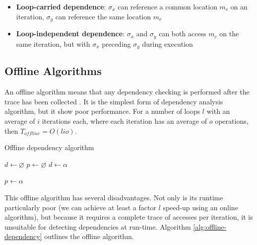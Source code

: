 	\begin{itemize}
		\item \textbf{Loop-carried dependence}: $\sigma_x$ can reference a common location $m_c$ on an iteration, $\sigma_y$ can reference the same location $m_c$
		\item \textbf{Loop-independent dependence}: $\sigma_x$ and $\sigma_y$ can both access $m_c$ on the same iteration, but with $\sigma_x$ preceding $\sigma_y$ during execution
	\end{itemize}

	\subsection{Offline Algorithms} \label{sec:runtime/analysis/offline}
	An offline algorithm means that any dependency checking is performed after the trace has been collected \citep[p.~525-526]{TAOCPvol2}. It is the simplest form of dependency analysis algorithm, but it show poor performance. For a number of loops $l$ with an average of $i$ iterations each, where each iteration has an average of $o$ operations, then $T_{offline}=O(lio)$.
	
	\begin{algorithm}
		\caption{Offline dependency algorithm}
		\label{alg:offline-dependency}
		\begin{algorithmic}[1]
			\STATE $d \gets \varnothing$ %
				\STATE $p \gets \varnothing$ %
								\STATE $d \gets \alpha$
							\ENDIF
							
							\STATE $p \gets \alpha$
						\ENDFOR
					\ENDFOR
				\ENDFOR
			\ENDFOR
		\end{algorithmic}
	\end{algorithm}
	
	This offline algorithm has several disadvantages. Not only is its runtime particularly poor (we can achieve at least a factor $l$ speed-up using an online algorithm), but because it requires a complete trace of accesses per iteration, it is unsuitable for  detecting dependencies at run-time. Algorithm \ref{alg:offline-dependency} outlines the offline algorithm.


